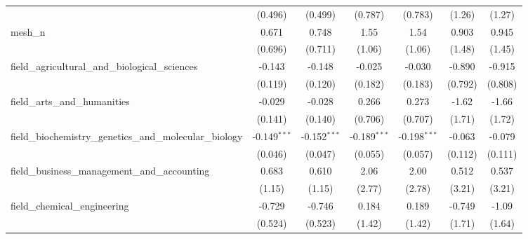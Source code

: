 \begin{tabular}{lcccccc}
                                                               & (0.496)        & (0.499)        & (0.787)        & (0.783)        & (1.26)         & (1.27)\\   
   mesh\_n                                                     & 0.671          & 0.748          & 1.55           & 1.54           & 0.903          & 0.945\\   
                                                               & (0.696)        & (0.711)        & (1.06)         & (1.06)         & (1.48)         & (1.45)\\   
   field\_agricultural\_and\_biological\_sciences              & -0.143         & -0.148         & -0.025         & -0.030         & -0.890         & -0.915\\   
                                                               & (0.119)        & (0.120)        & (0.182)        & (0.183)        & (0.792)        & (0.808)\\   
   field\_arts\_and\_humanities                                & -0.029         & -0.028         & 0.266          & 0.273          & -1.62          & -1.66\\   
                                                               & (0.141)        & (0.140)        & (0.706)        & (0.707)        & (1.71)         & (1.72)\\   
   field\_biochemistry\_genetics\_and\_molecular\_biology      & -0.149$^{***}$ & -0.152$^{***}$ & -0.189$^{***}$ & -0.198$^{***}$ & -0.063         & -0.079\\   
                                                               & (0.046)        & (0.047)        & (0.055)        & (0.057)        & (0.112)        & (0.111)\\   
   field\_business\_management\_and\_accounting                & 0.683          & 0.610          & 2.06           & 2.00           & 0.512          & 0.537\\   
                                                               & (1.15)         & (1.15)         & (2.77)         & (2.78)         & (3.21)         & (3.21)\\   
   field\_chemical\_engineering                                & -0.729         & -0.746         & 0.184          & 0.189          & -0.749         & -1.09\\   
                                                               & (0.524)        & (0.523)        & (1.42)         & (1.42)         & (1.71)         & (1.64)\\   

\end{tabular}
